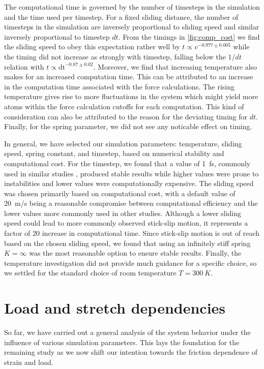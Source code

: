 The computational time is governed by the number of timesteps in the simulation
and the time used per timestep. For a fixed sliding distance, the number of timesteps in the simulation are inversely proportional
to sliding speed and similar inversely proportional to timestep $dt$. From the
timings in \cref{fig:comp_cost} we find the sliding speed to obey this
expectation rather well by $t \propto v^{-0.977 \pm 0.005}$ while the timing did
not increase as strongly with timestep, falling below the $1/dt$ relation with $t
\propto \text{dt}^{-0.87\pm 0.02}$. Moreover, we find that increasing
temperature also makes for an increased computation time. This can be attributed
to an increase in the computation time associated with the force calculations. The
rising temperature gives rise to more fluctuations in the system which might
yield more atoms within the force calculation cutoffs for each computation. This kind of consideration can also be attributed to the reason for the deviating timing for $dt$. Finally, for the spring parameter, we did not see any noticable effect on timing.


In general, we have selected our simulation parameters: temperature, sliding speed, spring constant, and timestep, based on numerical stability
and computational cost. For the timestep, we found that a value of \SI{1}{fs},
commonly used in similar studies \cite{liu_high-speed_2014, zhu_study_2018},
produced stable results while higher values were prone to instabilities and
lower values were computationally expensive. The sliding speed was chosen primarily based on computational cost, with a default value of \SI{20}{m/s} being a reasonable compromise between computational efficiency and the lower values more commonly used in other studies. Although a lower sliding speed could lead to more commonly observed stick-slip motion, it represents a factor of 20 increase in computational time. Since stick-slip motion is out of reach based on the chosen sliding speed, we found that using an infinitely stiff spring $K = \infty$ was the most reasonable option to ensure stable results. Finally, the temperature investigation did not provide much guidance for a specific choice, so we settled for the standard choice of room temperature $T = \SI{300}{K}$.



\section{Load and stretch dependencies}\label{sec:load_and_stretch}
So far, we have carried out a general analysis of the system behavior under the influence of various simulation parameters. This lays the foundation for the remaining study as we now shift our intention towards the friction dependence of strain and load.

